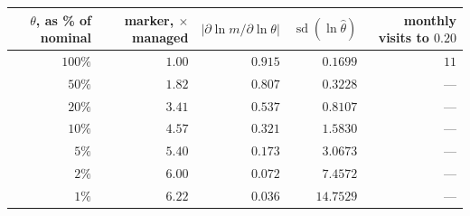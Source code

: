 \begin{tabular}{@{}rrrrr@{}}
\toprule
\textbf{$\theta$, as \% of nominal} & \textbf{marker, $\times$ managed} & \textbf{$\lvert\partial\ln m/\partial\ln\theta\rvert$} & \textbf{$\operatorname{sd}(\ln\hat\theta)$} & \textbf{monthly visits to $0.20$} \\
\midrule
$100\%$ & $1.00$ & $0.915$ & $\mathbf{0.1699}$ & $11$ \\
$50\%$ & $1.82$ & $0.807$ & $0.3228$ & --- \\
$20\%$ & $3.41$ & $0.537$ & $0.8107$ & --- \\
$10\%$ & $4.57$ & $0.321$ & $1.5830$ & --- \\
$5\%$ & $5.40$ & $0.173$ & $3.0673$ & --- \\
$2\%$ & $6.00$ & $0.072$ & $7.4572$ & --- \\
$1\%$ & $6.22$ & $0.036$ & $14.7529$ & --- \\
\bottomrule
\end{tabular}
